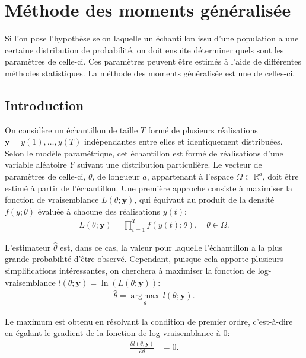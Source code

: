 \chapter{Méthode des moments généralisée} %

Si l'on pose l'hypothèse selon laquelle un échantillon issu d'une
population a une certaine distribution de probabilité, on doit
ensuite déterminer quels sont les paramètres de celle-ci. Ces
paramètres peuvent être estimés à l'aide de différentes méthodes
statistiques. La méthode des moments généralisée est une de celles-ci.

\section{Introduction}
\label{sec:intromethodeGMM}

On considère un échantillon de taille $T$ formé de plusieurs
réalisations $\mathbf{y} = y(1),\ldots,y(T)$ indépendantes entre elles
et identiquement distribuées. Selon le modèle paramétrique, cet
échantillon est formé de réalisations d'une variable aléatoire $Y$
suivant une distribution particulière. Le vecteur de paramètres de
celle-ci, $\theta$, de longueur $a$, appartenant à l'espace $\Omega
\subset \mathbb{R}^a$, doit être estimé à partir de l'échantillon. Une
première approche consiste à maximiser la fonction de vraisemblance
$L(\theta;\mathbf{y})$, qui équivaut au produit de la densité
$f(y;\theta)$ évaluée à chacune des réalisations $y(t)$:
\begin{align}
  \label{eq:vraisemblance}
  L(\theta;\mathbf{y}) = \prod_{t=1}^T
  f(y(t);\theta),\quad\theta\in\Omega.
\end{align}

L'estimateur $\hat\theta$ est, dans ce cas, la valeur pour
laquelle l'échantillon a la plus grande probabilité d'être
observé. Cependant, puisque cela apporte plusieurs simplifications
intéressantes, on cherchera à maximiser la fonction de
log-vraisemblance $l(\theta;\mathbf{y}) =
\ln{(L(\theta;\mathbf{y}))}$:
\begin{align}
  \label{eq:thetavraisemblance}
  \hat\theta = \underset{\theta}{\operatorname{arg\,max}} \,
  l(\theta;\mathbf{y}).
\end{align}

Le maximum est obtenu en résolvant la condition de premier ordre,
c'est-à-dire en égalant le gradient de la fonction de
log-vraisemblance à 0:
\begin{align}
  \label{eq:EEvraisemblance}
  \frac{\partial{l(\theta;\mathbf{y})}}{\partial{\theta}} &= 0.
\end{align}

